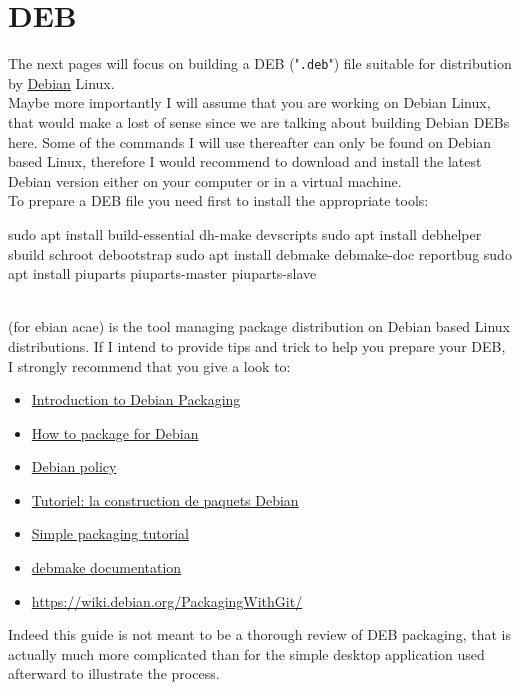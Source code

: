 \section{DEB}

\newcommand{\ddir}{"\bftt{debian}" directory}
\newcommand{\dpkg}{"\bftt{dpkg}" command}

The next pages will focus on building a DEB ("\texttt{.deb}") file suitable for distribution by \href{https://www.debian.org}{Debian} Linux. \\[0.25cm]
Maybe more importantly I will assume that you are working on Debian Linux, that would make
a lost of sense since we are talking about building Debian DEBs here. Some of the commands
I will use thereafter can only be found on Debian based Linux, therefore I would recommend to download
and install the latest Debian version either on your computer or in a virtual machine. \\[0.25cm]
To prepare a DEB file you need first to install the appropriate tools:
{\small{
\begin{script}
\uprompt{~} sudo apt install build-essential dh-make devscripts 
\uprompt{~} sudo apt install debhelper sbuild schroot debootstrap
\uprompt{~} sudo apt install debmake debmake-doc reportbug 
\uprompt{~} sudo apt install piuparts piuparts-master piuparts-slave
\end{script}
}}
\\[-0.25cm]
\noindent {} (for ebian acae) is the tool managing package distribution on Debian based Linux distributions. 
If I intend to provide tips and trick to help you prepare your DEB, I strongly recommend that you give a look to:
\begin{itemize}
\item \href{https://wiki.debian.org/Packaging/Intro?action=show\&redirect=IntroDebianPackaging}{Introduction to Debian Packaging}
\item \href{https://wiki.debian.org/HowToPackageForDebian}{How to package for Debian}
\item \href{https://www.debian.org/doc/debian-policy/}{Debian policy}
\item \href{https://www.debian.org/doc/manuals/packaging-tutorial/packaging-tutorial.fr.pdf}{Tutoriel: la construction de paquets Debian}
\item \href{https://wiki.debian.org/SimplePackagingTutorial}{Simple packaging tutorial}
\item \href{file://usr/share/doc/debmake-doc/}{debmake documentation}
\item \href{https://wiki.debian.org/PackagingWithGit/}{https://wiki.debian.org/PackagingWithGit/}
\end{itemize}
Indeed this guide is not meant to be a thorough review of DEB packaging, that is actually
much more complicated than for the simple desktop application used afterward to illustrate the process.

